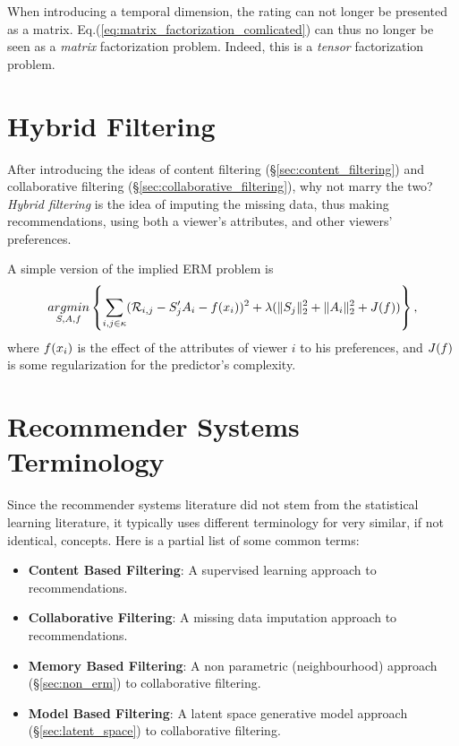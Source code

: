\begin{remark}
When introducing a temporal dimension, the rating can not longer be presented as a matrix.
Eq.(\ref{eq:matrix_factorization_comlicated}) can thus no longer be seen as a \emph{matrix} factorization problem.
Indeed, this is a \emph{tensor} factorization problem.
\end{remark}




\section{Hybrid Filtering}
After introducing the ideas of content filtering (\S\ref{sec:content_filtering}) and collaborative filtering (\S\ref{sec:collaborative_filtering}), why not marry the two?
\emph{Hybrid filtering} is the idea of imputing the missing data, thus making recommendations, using both a viewer's attributes, and other viewers' preferences.

A simple version of the implied ERM problem is 
\begin{align}
\label{eq:hybrid_filtering}
	\mathop{argmin} _{S,A, f}\left\{ \sum_{i,j \in \kappa} (\mathcal{R}_{i,j} - S_j' A_i - f(x_i) )^2 + \lambda (\Vert S_j \Vert_2^2 + \Vert A_i \Vert_2^2+ J(f))  \right\},
\end{align}
where $f(x_i)$ is the effect of the attributes of viewer $i$ to his preferences, and $J(f)$ is some regularization for the predictor's complexity.


\section{Recommender Systems Terminology}

Since the recommender systems literature did not stem from the statistical learning literature, it typically uses different terminology for very similar, if not identical, concepts.
Here is a partial list of some common terms:

\begin{itemize}
\item \textbf{Content Based Filtering}: A supervised learning approach to recommendations. 
\item \textbf{Collaborative Filtering}: A missing data imputation approach to recommendations.
\item \textbf{Memory Based Filtering}: A non parametric (neighbourhood) approach (\S\ref{sec:non_erm}) to collaborative filtering.
\item \textbf{Model Based Filtering}: A latent space generative model approach (\S\ref{sec:latent_space}) to collaborative filtering.
\end{itemize}



